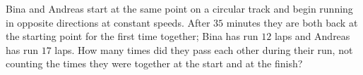 Bina and Andreas start at the same point on a circular track and begin running in opposite directions at constant speeds. After $35$ minutes they are both back at the starting point for the first time together; Bina has run $12$ laps and Andreas has run $17$ laps. How many times did they pass each other during their run, not counting the times they were together at the start and at the finish?
